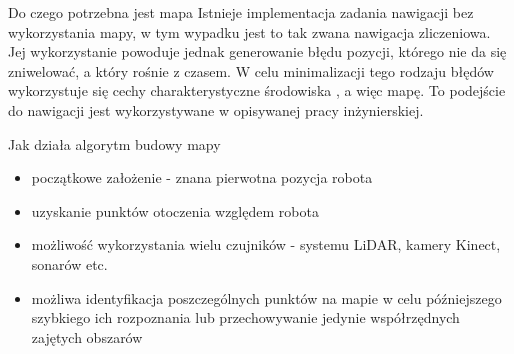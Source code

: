 

\begin{frame}{Do czego potrzebna jest mapa}
	Istnieje implementacja zadania nawigacji bez wykorzystania mapy, w tym wypadku jest to tak zwana nawigacja zliczeniowa. 
	Jej wykorzystanie powoduje jednak generowanie błędu pozycji, którego nie da się zniwelować,	a który rośnie z czasem.
	W celu minimalizacji tego rodzaju błędów wykorzystuje się cechy charakterystyczne środowiska \cite{robotics_vision_dead_reckon}, a więc mapę.
	To podejście do nawigacji jest wykorzystywane w opisywanej pracy inżynierskiej.
\end{frame}

\begin{frame}{Jak działa algorytm budowy mapy}
	\begin{itemize}
		\item początkowe założenie - znana pierwotna pozycja robota
		\item uzyskanie punktów otoczenia względem robota
		\item możliwość wykorzystania wielu czujników - systemu LiDAR, kamery Kinect, sonarów etc.
		\item możliwa identyfikacja poszczególnych punktów na mapie w celu późniejszego szybkiego ich rozpoznania lub przechowywanie jedynie współrzędnych zajętych obszarów
	\end{itemize}
\end{frame}

